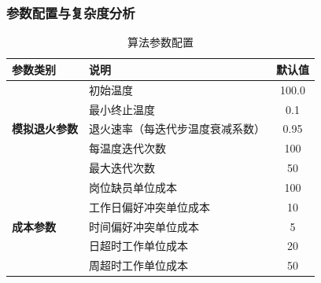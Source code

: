 \documentclass{ctexart}
\begin{document}
\subsubsection{参数配置与复杂度分析}
\begin{table}[H]
    \centering
    \caption{算法参数配置}
    \label{tab:sa_params}
    \begin{tabularx}{\linewidth}{|l|X|c|}
    \hline
    \textbf{参数类别} & \textbf{说明} & \textbf{默认值} \\ \hline
    
    \multirow{5}{*}{\textbf{模拟退火参数}} 
        & 初始温度 & 100.0 \\ \cline{2-3}
        & 最小终止温度 & 0.1 \\ \cline{2-3}
        & 退火速率（每迭代步温度衰减系数） & 0.95 \\ \cline{2-3}
        & 每温度迭代次数 & 100 \\ \cline{2-3}
        & 最大迭代次数 & 50 \\ \hline
    
    \multirow{5}{*}{\textbf{成本参数}}
        & 岗位缺员单位成本 & 100 \\ \cline{2-3}
        & 工作日偏好冲突单位成本 & 10 \\ \cline{2-3}
        & 时间偏好冲突单位成本 & 5 \\ \cline{2-3}
        & 日超时工作单位成本 & 20 \\ \cline{2-3}
        & 周超时工作单位成本 & 50 \\ \hline
    \end{tabularx}
\end{table}
\end{document}
